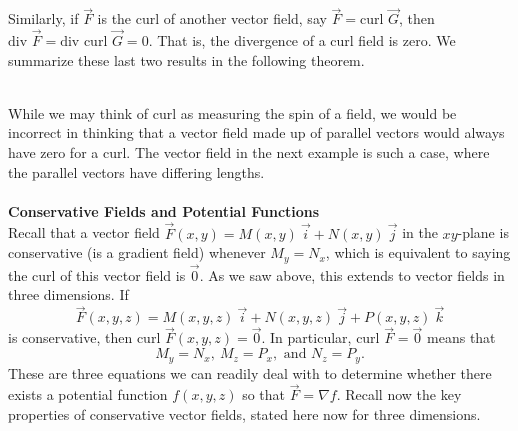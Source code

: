 Similarly, if $\vec F$ is the curl of another vector field, say $\vec F = \text{curl } \vec G$, then $\text{div } \vec F = \text{div } \text{curl } \vec G = 0$.  That is, the divergence of a curl field is zero.  We summarize these last two results in the following theorem.

\\

While we may think of curl as measuring the spin of a field, we would be incorrect in thinking that a vector field made up of parallel vectors would always have zero for a curl.  The vector field in the next example is such a case, where the parallel vectors have differing lengths.\\

\\

\noindent\textbf{\large Conservative Fields and Potential Functions}\\

Recall that a vector field $\vec F(x,y) = M(x,y) \: \vec i + N(x,y) \: \vec j$ in the $xy$-plane is conservative (is a gradient field) whenever $M_y = N_x$, which is equivalent to saying the curl of this vector field is $\vec 0$.  As we saw above, this extends to vector fields in three dimensions.  If $$\vec F(x,y,z) = M(x,y,z) \: \vec i + N(x,y,z) \: \vec j + P(x,y,z) \: \vec k$$ is conservative, then $\text{curl } \vec F(x,y,z) = \vec 0$.  In particular, $\text{curl } \vec F = \vec 0$ means that
$$M_y = N_x, \: M_z = P_x, \text{ and } N_z = P_y.$$
These are three equations we can readily deal with to determine whether there exists a potential function $f(x,y,z)$ so that $\vec F = \nabla f$.  Recall now the key properties of conservative vector fields, stated here now for three dimensions.\\

